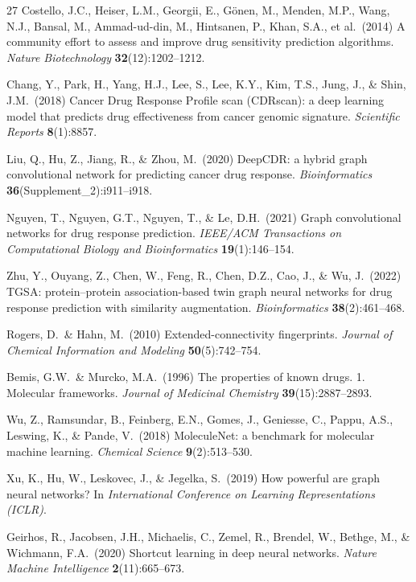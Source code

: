 \documentclass{article}
\begin{document}
\begin{thebibliography}{27}
Costello, J.C., Heiser, L.M., Georgii, E., G{\"o}nen, M., Menden, M.P., Wang, N.J., Bansal, M., Ammad-ud-din, M., Hintsanen, P., Khan, S.A., et al.\ (2014)
A community effort to assess and improve drug sensitivity prediction algorithms.
\emph{Nature Biotechnology} \textbf{32}(12):1202--1212.

Chang, Y., Park, H., Yang, H.J., Lee, S., Lee, K.Y., Kim, T.S., Jung, J., \& Shin, J.M.\ (2018)
Cancer Drug Response Profile scan (CDRscan): a deep learning model that predicts drug effectiveness from cancer genomic signature.
\emph{Scientific Reports} \textbf{8}(1):8857.

Liu, Q., Hu, Z., Jiang, R., \& Zhou, M.\ (2020)
DeepCDR: a hybrid graph convolutional network for predicting cancer drug response.
\emph{Bioinformatics} \textbf{36}(Supplement\_2):i911--i918.

Nguyen, T., Nguyen, G.T., Nguyen, T., \& Le, D.H.\ (2021)
Graph convolutional networks for drug response prediction.
\emph{IEEE/ACM Transactions on Computational Biology and Bioinformatics} \textbf{19}(1):146--154.

Zhu, Y., Ouyang, Z., Chen, W., Feng, R., Chen, D.Z., Cao, J., \& Wu, J.\ (2022)
TGSA: protein--protein association-based twin graph neural networks for drug response prediction with similarity augmentation.
\emph{Bioinformatics} \textbf{38}(2):461--468.

Rogers, D.\ \& Hahn, M.\ (2010)
Extended-connectivity fingerprints.
\emph{Journal of Chemical Information and Modeling} \textbf{50}(5):742--754.

Bemis, G.W.\ \& Murcko, M.A.\ (1996)
The properties of known drugs. 1. Molecular frameworks.
\emph{Journal of Medicinal Chemistry} \textbf{39}(15):2887--2893.

Wu, Z., Ramsundar, B., Feinberg, E.N., Gomes, J., Geniesse, C., Pappu, A.S., Leswing, K., \& Pande, V.\ (2018)
MoleculeNet: a benchmark for molecular machine learning.
\emph{Chemical Science} \textbf{9}(2):513--530.

Xu, K., Hu, W., Leskovec, J., \& Jegelka, S.\ (2019)
How powerful are graph neural networks?
In \emph{International Conference on Learning Representations (ICLR)}.

Geirhos, R., Jacobsen, J.H., Michaelis, C., Zemel, R., Brendel, W., Bethge, M., \& Wichmann, F.A.\ (2020)
Shortcut learning in deep neural networks.
\emph{Nature Machine Intelligence} \textbf{2}(11):665--673.


\end{thebibliography}
\end{document}
